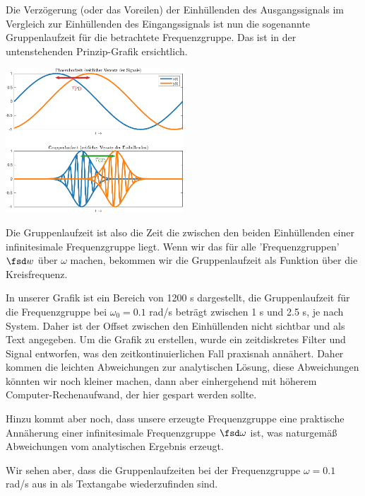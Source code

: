 \begin{Loesung}
Die Verzögerung (oder das Voreilen)
der Einhüllenden des Ausgangssignals im Vergleich zur Einhüllenden des
Eingangssignals ist nun die sogenannte Gruppenlaufzeit für die betrachtete
Frequenzgruppe. Das ist in der untenstehenden Prinzip-Grafik ersichtlich.
\begin{center}
\includegraphics[width=0.5\textwidth]{../system_properties_ct/PhasenGruppenlaufzeit.pdf}
\end{center}
Die Gruppenlaufzeit ist also die Zeit die zwischen den beiden Einhüllenden
einer infinitesimale Frequenzgruppe liegt. Wenn wir das für alle 'Frequenzgruppen'
$\fsd w$ über $\omega$ machen, bekommen wir die Gruppenlaufzeit als Funktion
über die Kreisfrequenz.

In unserer Grafik ist ein Bereich von 1200 s dargestellt, die Gruppenlaufzeit
für die Frequenzgruppe bei $\omega_0=0.1$ rad/s beträgt zwischen 1 s und 2.5 s, je
nach System. Daher ist der Offset zwischen den Einhüllenden nicht sichtbar
und als Text angegeben.
Um die Grafik zu erstellen, wurde ein zeitdiskretes Filter und Signal entworfen,
was den zeitkontinuierlichen Fall praxisnah annähert. Daher kommen die
leichten Abweichungen zur analytischen Lösung, diese Abweichungen könnten wir
noch kleiner machen, dann aber einhergehend mit höherem Computer-Rechenaufwand,
der hier gespart werden sollte.

Hinzu kommt aber noch, dass unsere erzeugte Frequenzgruppe eine praktische
Annäherung einer infinitesimale Frequenzgruppe $\fsd \omega$ ist, was naturgemäß
Abweichungen vom analytischen Ergebnis erzeugt.

Wir sehen aber, dass die Gruppenlaufzeiten bei der Frequenzgruppe
$\omega=0.1$ rad/s aus  in
 als Textangabe wiederzufinden sind.
\end{Loesung}

